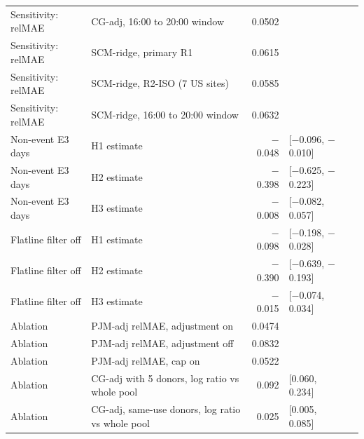 \begin{tabular}{@{}l>{\raggedright\arraybackslash}p{6.4cm}rll@{}}
Sensitivity: relMAE & CG-adj, 16:00 to 20:00 window & 0.0502 &  &  \\ %
Sensitivity: relMAE & SCM-ridge, primary R1 & 0.0615 &  &  \\ %
Sensitivity: relMAE & SCM-ridge, R2-ISO (7 US sites) & 0.0585 &  &  \\ %
Sensitivity: relMAE & SCM-ridge, 16:00 to 20:00 window & 0.0632 &  &  \\ %
\midrule
Non-event E3 days & H1 estimate & $-$0.048 & [$-$0.096, $-$0.010] &  \\ %
Non-event E3 days & H2 estimate & $-$0.398 & [$-$0.625, $-$0.223] &  \\ %
Non-event E3 days & H3 estimate & $-$0.008 & [$-$0.082, 0.057] &  \\ %
\midrule
Flatline filter off & H1 estimate & $-$0.098 & [$-$0.198, $-$0.028] &  \\ %
Flatline filter off & H2 estimate & $-$0.390 & [$-$0.639, $-$0.193] &  \\ %
Flatline filter off & H3 estimate & $-$0.015 & [$-$0.074, 0.034] &  \\ %
\midrule
Ablation & PJM-adj relMAE, adjustment on & 0.0474 &  &  \\ %
Ablation & PJM-adj relMAE, adjustment off & 0.0832 &  &  \\ %
Ablation & PJM-adj relMAE, cap on & 0.0522 &  &  \\ %
Ablation & CG-adj with 5 donors, log ratio vs whole pool & 0.092 & [0.060, 0.234] &  \\ %
Ablation & CG-adj, same-use donors, log ratio vs whole pool & 0.025 & [0.005, 0.085] &  \\ %
\bottomrule
\end{tabular}
